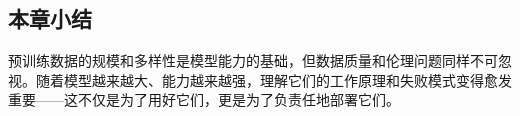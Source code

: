 \subsection{本章小结}

预训练数据的规模和多样性是模型能力的基础，但数据质量和伦理问题同样不可忽视。随着模型越来越大、能力越来越强，理解它们的工作原理和失败模式变得愈发重要——这不仅是为了用好它们，更是为了负责任地部署它们。


